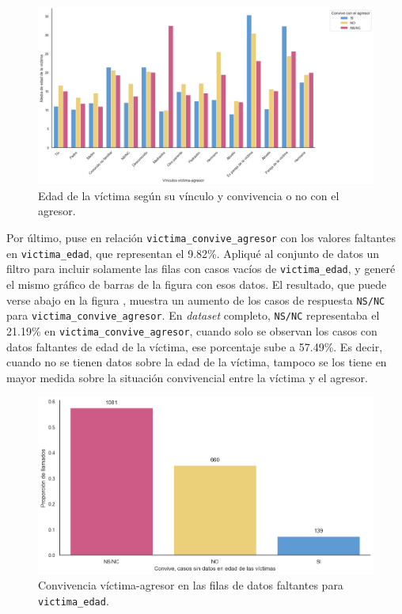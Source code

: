 \documentclass[10 pt]{article}
\begin{document}
\begin{figure}[H]
    \begin{center}
    \includegraphics[scale=.4]{images/convive_edad_agresor.png}
    \caption{Edad de la víctima según su vínculo y convivencia o no con el agresor.}
    \label{edadconvagr}
    \end{center}
    \end{figure}


Por último, puse en relación \texttt{victima\_convive\_agresor} con los valores faltantes en \texttt{victima\_edad}, que representan el 9.82\%. Apliqué al conjunto de datos un filtro para incluir solamente las filas con casos vacíos de \texttt{victima\_edad}, y generé el mismo gráfico de barras de la figura  con esos datos. El resultado, que puede verse abajo en la figura , muestra un aumento de los casos de respuesta \texttt{NS/NC} para \texttt{victima\_convive\_agresor}. En \textit{dataset} completo, \texttt{NS/NC} representaba el 21.19\% en \texttt{victima\_convive\_agresor}, cuando solo se observan los casos con datos faltantes de edad de la víctima, ese porcentaje sube a 57.49\%. Es decir, cuando no se tienen datos sobre la edad de la víctima, tampoco se los tiene en mayor medida sobre la situación convivencial entre la víctima y el agresor.

\begin{figure}[H]
    \begin{center}
    \includegraphics[scale=.5]{images/latex_convive_sd_edad_vic.png}
    \caption{Convivencia víctima-agresor en las filas de datos faltantes para \texttt{victima\_edad}.}
    \label{conviveedadfaltantevic}
    \end{center}
    \end{figure}
\end{document}
